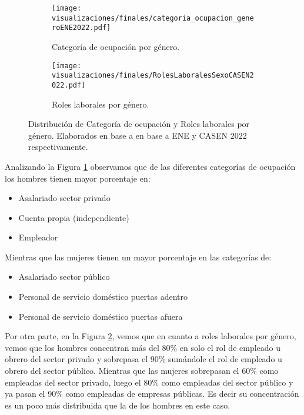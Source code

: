 \FloatBarrier

\begin{figure}[htbp]
	\centering
	\begin{subfigure}[b]{0.49\textwidth}
		\centering
		\texttt{[image: visualizaciones/finales/categoria\_ocupacion\_generoENE2022.pdf]}
		\caption{Categoría de ocupación por género.}
		\label{10a} 
	\end{subfigure}
	\hfill
	\begin{subfigure}[b]{0.49\textwidth}
		\centering
		\texttt{[image: visualizaciones/finales/RolesLaboralesSexoCASEN2022.pdf]}
		\caption{Roles laborales por género.}
		\label{10b}
	\end{subfigure}
	\caption{Distribución de Categoría de ocupación y Roles laborales por género. Elaborados en base a  en base a ENE y CASEN 2022 respectivamente.}
	\label{10fig}
\end{figure}

\FloatBarrier

Analizando la Figura \ref{10a} observamos que de las diferentes categorías de ocupación los hombres tienen mayor porcentaje en: 

\begin{itemize}
	\item Asalariado sector privado
	\item Cuenta propia (independiente)
	\item Empleador
\end{itemize}

Mientras que las mujeres tienen un mayor porcentaje en las categorías de:

\begin{itemize}
	\item Asalariado sector público
	\item Personal de servicio doméstico puertas adentro
	\item Personal de servicio doméstico puertas afuera
\end{itemize}

Por otra parte, en la Figura \ref{10b}, vemos que en cuanto a roles laborales por género, vemos que los hombres concentran más del 80\% en solo el rol de empleado u obrero del sector privado y sobrepasa el 90\% sumándole el rol de empleado u obrero del sector público. Mientras que las mujeres sobrepasan el 60\% como empleadas del sector privado, luego el 80\% como empleadas del sector público y ya pasan el 90\% como empleadas de empresas públicas. Es decir su concentración es un poco más distribuida que la de los hombres en este caso.

